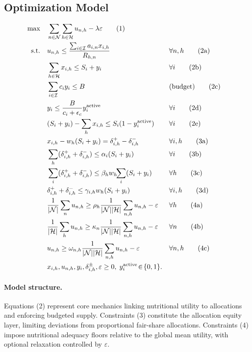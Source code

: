 \documentclass[preprint,12pt]{elsarticle}
\begin{document}
\subsection{Optimization Model}
\begin{align}
\max \quad & \sum_{n \in \mathcal{N}}\sum_{h \in \mathcal{H}} u_{n,h} - \lambda \varepsilon \tag{1}\\
\text{s.t.}\quad 
& u_{n,h} \le \frac{\sum_{i \in \mathcal{I}} a_{i,n} x_{i,h}}{R_{h,n}} && \forall n,h \tag{2a}\\
& \sum_{h \in \mathcal{H}} x_{i,h} \le S_i + y_i && \forall i \tag{2b}\\
& \sum_{i \in \mathcal{I}} c_i y_i \le B && \text{(budget)} \tag{2c}\\
& y_i \le \frac{B}{c_i+\epsilon_c} y_i^{\mathrm{active}} && \forall i \tag{2d}\\
& (S_i+y_i) - \sum_{h} x_{i,h} \le S_i(1-y_i^{\mathrm{active}}) && \forall i \tag{2e}\\
& x_{i,h} - w_h(S_i+y_i) = \delta_{i,h}^{+}-\delta_{i,h}^{-} && \forall i,h \tag{3a}\\
& \sum_{h} (\delta_{i,h}^{+}+\delta_{i,h}^{-}) \le \alpha_i (S_i+y_i) && \forall i \tag{3b}\\
& \sum_{i} (\delta_{i,h}^{+}+\delta_{i,h}^{-}) \le \beta_h w_h\!\!\sum_{i}(S_i+y_i) && \forall h \tag{3c}\\
& \delta_{i,h}^{+}+\delta_{i,h}^{-} \le \gamma_{i,h}w_h(S_i+y_i) && \forall i,h \tag{3d}\\
& \frac{1}{|\mathcal{N}|}\sum_{n} u_{n,h} \ge \rho_h \frac{1}{|\mathcal{N}||\mathcal{H}|}\sum_{n,h} u_{n,h} - \varepsilon && \forall h \tag{4a}\\
& \frac{1}{|\mathcal{H}|}\sum_{h} u_{n,h} \ge \kappa_n \frac{1}{|\mathcal{N}||\mathcal{H}|}\sum_{n,h} u_{n,h} - \varepsilon && \forall n \tag{4b}\\
& u_{n,h} \ge \omega_{n,h} \frac{1}{|\mathcal{N}||\mathcal{H}|}\sum_{n,h} u_{n,h} - \varepsilon && \forall n,h \tag{4c}\\
& x_{i,h},u_{n,h},y_i,\delta_{i,h}^{\pm},\varepsilon \ge 0,\; y_i^{\mathrm{active}}\!\in\!\{0,1\}. \notag
\end{align}

\paragraph{Model structure.}
Equations (2) represent core mechanics linking nutritional utility to allocations and enforcing budgeted supply. Constraints (3) constitute the allocation equity layer, limiting deviations from proportional fair-share allocations. Constraints (4) impose nutritional adequacy floors relative to the global mean utility, with optional relaxation controlled by $\varepsilon$.
\end{document}

